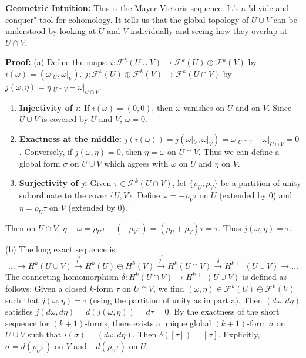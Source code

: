\begin{solution}
\textbf{Geometric Intuition:} This is the Mayer-Vietoris sequence. It's a "divide and conquer" tool for cohomology. It tells us that the global topology of $U \cup V$ can be understood by looking at $U$ and $V$ individually and seeing how they overlap at $U \cap V$.

\textbf{Proof:}
(a) Define the maps:
$i: \mathcal{F}^k(U \cup V) \to \mathcal{F}^k(U) \oplus \mathcal{F}^k(V)$ by $i(\omega) = (\omega|_U, \omega|_V)$.
$j: \mathcal{F}^k(U) \oplus \mathcal{F}^k(V) \to \mathcal{F}^k(U \cap V)$ by $j(\omega, \eta) = \eta|_{U \cap V} - \omega|_{U \cap V}$.
\begin{enumerate}
    \item \textbf{Injectivity of $i$:} If $i(\omega) = (0, 0)$, then $\omega$ vanishes on $U$ and on $V$. Since $U \cup V$ is covered by $U$ and $V$, $\omega = 0$.
    \item \textbf{Exactness at the middle:} $j(i(\omega)) = j(\omega|_U, \omega|_V) = \omega|_{U \cap V} - \omega|_{U \cap V} = 0$. Conversely, if $j(\omega, \eta) = 0$, then $\eta = \omega$ on $U \cap V$. Thus we can define a global form $\sigma$ on $U \cup V$ which agrees with $\omega$ on $U$ and $\eta$ on $V$.
    \item \textbf{Surjectivity of $j$:} Given $\tau \in \mathcal{F}^k(U \cap V)$, let $\{\rho_U, \rho_V\}$ be a partition of unity subordinate to the cover $\{U, V\}$. Define $\omega = -\rho_V \tau$ on $U$ (extended by 0) and $\eta = \rho_U \tau$ on $V$ (extended by 0).
\end{enumerate}
Then on $U \cap V$, $\eta - \omega = \rho_U \tau - (-\rho_V \tau) = (\rho_U + \rho_V) \tau = \tau$. Thus $j(\omega, \eta) = \tau$.

(b) The long exact sequence is:
\[ \dots \to H^k(U \cup V) \xrightarrow{i^*} H^k(U) \oplus H^k(V) \xrightarrow{j^*} H^k(U \cap V) \xrightarrow{\delta} H^{k+1}(U \cup V) \to \dots \]
The connecting homomorphism $\delta: H^k(U \cap V) \to H^{k+1}(U \cup V)$ is defined as follows:
Given a closed $k$-form $\tau$ on $U \cap V$, we find $(\omega, \eta) \in \mathcal{F}^k(U) \oplus \mathcal{F}^k(V)$ such that $j(\omega, \eta) = \tau$ (using the partition of unity as in part a).
Then $(d\omega, d\eta)$ satisfies $j(d\omega, d\eta) = d(j(\omega, \eta)) = d\tau = 0$.
By the exactness of the short sequence for $(k+1)$-forms, there exists a unique global $(k+1)$-form $\sigma$ on $U \cup V$ such that $i(\sigma) = (d\omega, d\eta)$.
Then $\delta([\tau]) = [\sigma]$. Explicitly, $\sigma = d(\rho_U \tau)$ on $V$ and $-d(\rho_V \tau)$ on $U$.
\end{solution}

